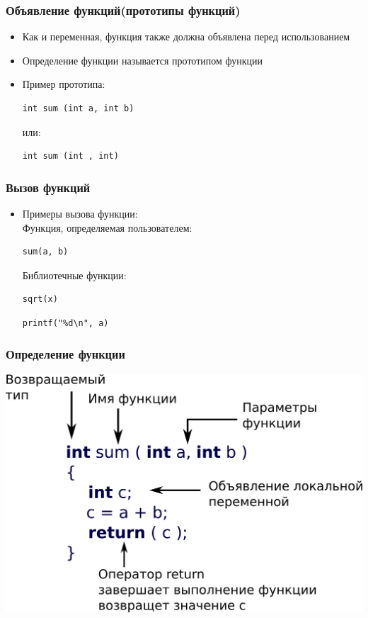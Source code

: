 \documentclass[12pt,pdf,hyperref={unicode}]{beamer}
\begin{document}
\begin{frame}[fragile]
\frametitle{Объявление функций(прототипы функций)} 
\begin{itemize}
\item Как и переменная, функция также должна объявлена перед использованием
\item Определение функции называется прототипом функции
\item Пример прототипа:\\
\begin{lstlisting}
int sum (int a, int b)
\end{lstlisting}
или:
\begin{lstlisting}
int sum (int , int)
\end{lstlisting}
\end{itemize}
\end{frame}


\begin{frame}[fragile]
\frametitle{Вызов функций} 
\begin{itemize}
\item Примеры вызова функции:\\
Функция, определяемая пользователем:\\
\begin{lstlisting}
sum(a, b)
\end{lstlisting}
Библиотечные функции:\\
\begin{lstlisting}
sqrt(x)
\end{lstlisting}
\begin{lstlisting}
printf("%d\n", a)
\end{lstlisting}
\end{itemize}
\end{frame}



\begin{frame}[fragile]
\frametitle{Определение функции} 
\begin{center}
\includegraphics[width=0.8\linewidth]{images/function_syntax.png}
\end{center}
\end{frame}
\end{document}
